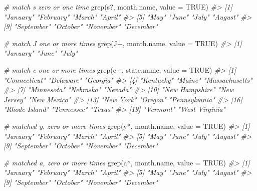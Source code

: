 \documentclass[
]{book}
\newenvironment{Shaded}{\begin{snugshade}}{\end{snugshade}}
\newcommand{\AttributeTok}[1]{\textcolor[rgb]{0.77,0.63,0.00}{#1}}
\newcommand{\CommentTok}[1]{\textcolor[rgb]{0.56,0.35,0.01}{\textit{#1}}}
\newcommand{\ConstantTok}[1]{\textcolor[rgb]{0.00,0.00,0.00}{#1}}
\newcommand{\FunctionTok}[1]{\textcolor[rgb]{0.00,0.00,0.00}{#1}}
\newcommand{\NormalTok}[1]{#1}
\newcommand{\StringTok}[1]{\textcolor[rgb]{0.31,0.60,0.02}{#1}}
\begin{document}
\begin{Shaded}
\begin{Highlighting}[]
\CommentTok{\# match \textquotesingle{}s\textquotesingle{} zero or one time}
\FunctionTok{grep}\NormalTok{(}\StringTok{\textquotesingle{}s?\textquotesingle{}}\NormalTok{, month.name, }\AttributeTok{value =} \ConstantTok{TRUE}\NormalTok{)}
\CommentTok{\#\textgreater{}  [1] "January"   "February"  "March"     "April"    }
\CommentTok{\#\textgreater{}  [5] "May"       "June"      "July"      "August"   }
\CommentTok{\#\textgreater{}  [9] "September" "October"   "November"  "December"}

\CommentTok{\# match \textquotesingle{}J\textquotesingle{} one or more times}
\FunctionTok{grep}\NormalTok{(}\StringTok{\textquotesingle{}J+\textquotesingle{}}\NormalTok{, month.name, }\AttributeTok{value =} \ConstantTok{TRUE}\NormalTok{)}
\CommentTok{\#\textgreater{} [1] "January" "June"    "July"}

\CommentTok{\# match \textquotesingle{}e\textquotesingle{} one or more times}
\FunctionTok{grep}\NormalTok{(}\StringTok{\textquotesingle{}e+\textquotesingle{}}\NormalTok{, state.name, }\AttributeTok{value =} \ConstantTok{TRUE}\NormalTok{)}
\CommentTok{\#\textgreater{}  [1] "Connecticut"   "Delaware"      "Georgia"      }
\CommentTok{\#\textgreater{}  [4] "Kentucky"      "Maine"         "Massachusetts"}
\CommentTok{\#\textgreater{}  [7] "Minnesota"     "Nebraska"      "Nevada"       }
\CommentTok{\#\textgreater{} [10] "New Hampshire" "New Jersey"    "New Mexico"   }
\CommentTok{\#\textgreater{} [13] "New York"      "Oregon"        "Pennsylvania" }
\CommentTok{\#\textgreater{} [16] "Rhode Island"  "Tennessee"     "Texas"        }
\CommentTok{\#\textgreater{} [19] "Vermont"       "West Virginia"}

\CommentTok{\# matched \textquotesingle{}y\textquotesingle{}, zero or more times}
\FunctionTok{grep}\NormalTok{(}\StringTok{\textquotesingle{}y*\textquotesingle{}}\NormalTok{, month.name, }\AttributeTok{value =} \ConstantTok{TRUE}\NormalTok{)}
\CommentTok{\#\textgreater{}  [1] "January"   "February"  "March"     "April"    }
\CommentTok{\#\textgreater{}  [5] "May"       "June"      "July"      "August"   }
\CommentTok{\#\textgreater{}  [9] "September" "October"   "November"  "December"}

\CommentTok{\# matched \textquotesingle{}a\textquotesingle{}, zero or more times}
\FunctionTok{grep}\NormalTok{(}\StringTok{\textquotesingle{}a*\textquotesingle{}}\NormalTok{, month.name, }\AttributeTok{value =} \ConstantTok{TRUE}\NormalTok{)}
\CommentTok{\#\textgreater{}  [1] "January"   "February"  "March"     "April"    }
\CommentTok{\#\textgreater{}  [5] "May"       "June"      "July"      "August"   }
\CommentTok{\#\textgreater{}  [9] "September" "October"   "November"  "December"}


\end{Highlighting}
\end{Shaded}
\end{document}
